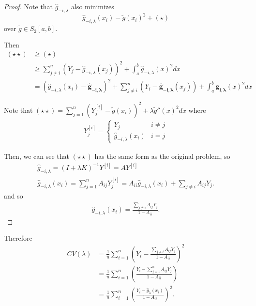 \begin{proof}
  Note that $\hat g_{-i, \lambda}$ also minimizes
  \begin{equation}
    \label{eq:153}
    \hat g_{-i, \lambda}(x_{i}) - \tilde g(x_{i})^{2} + (\star)
    \tag{$\star \star$}
  \end{equation} over
  $\tilde g \in S_{2}[a, b]$.

  Then
  \begin{align}
    \label{eq:77}
    (\star \star) &\geq (\star) \\
    &\geq \sum_{j \neq i}^{n} (Y_{j} - \hat g_{-i,
      \lambda} (x_{j}))^{2} + \int_{a}^{b} \hat g_{-i,
      \lambda}(x)^{2} dx \\
    &= (\hat g_{-i, \lambda}(x_{i}) - \mathbf{ \hat g_{-i,
        \lambda}})^{2} + \sum_{j \neq i}^{n} (Y_{i} - \mathbf{\hat
      g_{-i, \lambda}}(x_{j})) + \int_{a}^{b} \mathbf{g_{i,
        \lambda}}(x)^{2} dx
  \end{align}

  Note that $(\star \star) = \sum_{j = 1}^{n} (Y^{[i]}_{j} - \tilde
  g(x_{i}))^{2} + \lambda \tilde g''(x)^{2} dx$ where
  \begin{align}
    \label{eq:78}
    Y_{j}^{[i]} =
    \begin{cases}
      Y_{j} & i \neq j \\
      \hat g_{-i, \lambda}(x_{i}) & i = j
    \end{cases}
  \end{align}

  Then, we can see that $(\star \star)$ has the same form as the
  original problem, so
  \begin{align}
    \label{eq:79}
    \hat g_{-i, \lambda} = (I + \lambda K)^{-1} Y^{[i]} = A Y^{[i]} \\
    \hat g_{-i, \lambda}(x_{i}) = \sum_{j=1}^{n} A_{ij} Y_{j}^{[i]} =
    A_{ii} \hat g_{-i, \lambda}(x_{i}) + \sum_{j \neq i} A_{ij} Y_{j}.
  \end{align} and so
  \begin{align}
    \label{eq:155}
    \hat g_{-i, \lambda}(x_{i}) = \frac{\sum_{j \neq i} A_{ij} Y_{j}}{1
    - A_{ii}}.
  \end{align}
\end{proof}

Therefore
\begin{align}
  \label{eq:156}
  CV(\lambda) &= \frac{1}{n} \sum_{i=1}^{n} (Y_{i} - \frac{\sum_{j \neq
      i} A_{ij} Y_{j}}{1 - A_{ii}})^{2} \\
  \label{eq:157}
  &= \frac{1}{n} \sum_{i=1}^{n} (\frac{Y_{i} - \sum_{j=1}^{n} A_{ij}
    Y_{j}}{1 - A_{ii}}) \\
  \label{eq:158}
  &= \frac{1}{n} \sum_{i=1}^{n} (\frac{Y_{i} - \hat
    g_{\lambda}(x_{i})}{1 - A_{ii}})^{2}.
\end{align}

